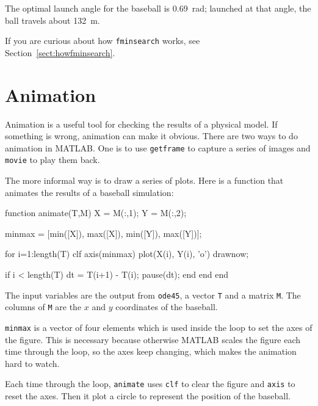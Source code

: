 \documentclass[
]{book}
\numberwithin{Answer}{chapter}
\numberwithin{Exercise}{chapter}
\begin{document}
The optimal launch angle for the baseball is \SI{0.69}{\radian}; launched at that angle, the ball travels about \SI{132}{\meter}.

If you are curious about how {\tt fminsearch} works, see Section~\ref{sect:howfminsearch}.


\section{Animation}

Animation is a useful tool for checking the results of a physical
model.  If something is wrong, animation can make it obvious.
There are two ways to do animation in MATLAB.  One is to use
{\tt getframe} to capture a series of images and {\tt movie} to
play them back.


The more informal way is to draw a series of plots.  Here is a function that animates the results of a baseball simulation:

\begin{code}
function animate(T,M)
    X = M(:,1);
    Y = M(:,2);

    minmax = [min([X]), max([X]), min([Y]), max([Y])];

    for i=1:length(T)
        clf
        axis(minmax)
        plot(X(i), Y(i), 'o')
        drawnow;
        
        if i < length(T)
            dt = T(i+1) - T(i);
            pause(dt);
        end
    end
end
\end{code}

The input variables are the output from {\tt ode45}, a vector
{\tt T} and a matrix {\tt M}.  The columns of {\tt M} are the
$x$ and $y$ coordinates of the baseball.


{\tt minmax} is a vector of four elements which is used inside
the loop to set the axes of the figure.  This is necessary because
otherwise MATLAB scales the figure each time through the loop,
so the axes keep changing, which makes the animation hard
to watch.


Each time through the loop, {\tt animate} uses {\tt clf}
to clear the figure and {\tt axis} to reset the axes.  Then it plot a circle to represent the position of the baseball.

\end{document}
